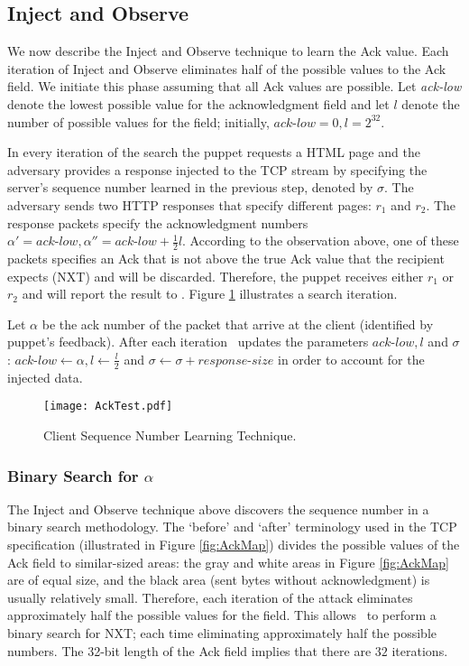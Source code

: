 \documentclass[conference]{IEEEtran}
\begin{document}
\subsection{Inject and Observe} \label{clientsnum}
We now describe the Inject and Observe technique to learn the Ack value. Each iteration of Inject and Observe eliminates half of the possible values to the Ack field. We initiate this phase assuming that all Ack values are possible. Let \textit{ack-low} denote the lowest possible value for the acknowledgment field and let $l$ denote the number of possible values for the field; initially, $\textit{ack-low} = 0, l = 2^{32}$. 

In every iteration of the search the puppet requests a HTML page and the adversary provides a response injected to the TCP stream by specifying the server's sequence number learned in the previous step, denoted by $\sigma$. The adversary sends two HTTP responses that specify different pages: $r_1$ and $r_2$. The response packets specify the acknowledgment numbers $\alpha' = \textit{ack-low}, \alpha'' = \textit{ack-low} + \frac{1}{2}l$. According to the observation above, one of these packets specifies an Ack that is not above the true Ack value that the recipient expects (NXT) and will be discarded. Therefore, the puppet receives either $r_1$ or $r_2$ and will report the result to \mal. Figure \ref{fig:AckTest} illustrates a search iteration.

Let $\alpha$ be the ack number of the packet that arrive at the client (identified by puppet's feedback). After each iteration \mal\ updates the parameters $\textit{ack-low}, l$ and $\sigma$: $\textit{ack-low} \leftarrow \alpha, l \leftarrow \frac{l}{2}$ and $\sigma \leftarrow \sigma + \textit{response-size}$ in order to account for the injected data.

\begin{figure}
	\centering
		\texttt{[image: AckTest.pdf]}
	\caption{Client Sequence Number Learning Technique.}
	\label{fig:AckTest}
\end{figure}



\subsubsection{Binary Search for $\alpha$} \label{Injection:SimpleBinary}

The Inject and Observe technique above discovers the sequence number in a binary search methodology. The `before' and `after' terminology used in the TCP specification (illustrated in Figure \ref{fig:AckMap}) divides the possible values of the Ack field to similar-sized areas: the gray and white areas in Figure \ref{fig:AckMap} are of equal size, and the black area (sent bytes without acknowledgment) is usually relatively small. Therefore, each iteration of the attack eliminates approximately half the possible values for the field. This allows \mal\ to perform a binary search for NXT; each time eliminating approximately half the possible numbers. The 32-bit length of the Ack field implies that there are $32$ iterations.
\end{document}
